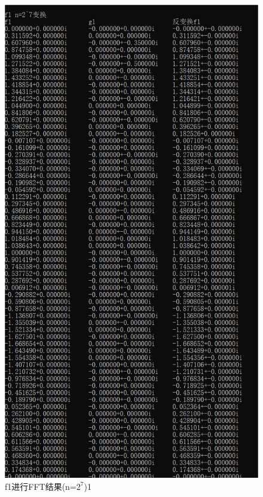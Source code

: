 \documentclass{article}
\begin{document}
\begin{figure}[!h]
	
	\centering
	\includegraphics[scale=0.4]{f1_7(1)}
	\caption{\heiti{}f1进行FFT结果(n=$ 2^7 $)1}

\end{figure}
\end{document}
